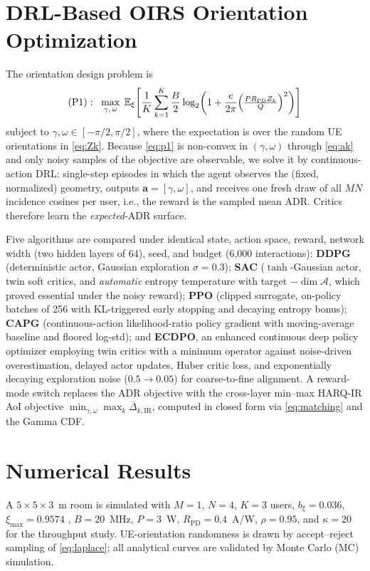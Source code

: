 \documentclass[conference]{IEEEtran}
\newcommand{\E}{\mathbb{E}}
\begin{document}
\section{DRL-Based OIRS Orientation Optimization}
The orientation design problem is
\begin{equation}
(\mathrm{P1}):\;\;
\max_{\gamma,\,\omega}\;
\E_{\xi}\!\left[\frac{1}{K}\sum_{k=1}^{K}
\frac{B}{2}\log_{2}\!\left(1+\frac{e}{2\pi}
\Bigl(\tfrac{P R_{\mathrm{PD}} Z_k}{Q}\Bigr)^{2}\right)\right]
\label{eq:p1}
\end{equation}
subject to $\gamma,\omega\in[-\pi/2,\pi/2]$, where the expectation is over
the random UE orientations in \eqref{eq:Zk}. Because \eqref{eq:p1} is
non-convex in $(\gamma,\omega)$ through \eqref{eq:ak} and only noisy samples
of the objective are observable, we solve it by continuous-action DRL:
single-step episodes in which the agent observes the (fixed, normalized)
geometry, outputs $\mathbf a=[\gamma,\omega]$, and receives one fresh draw of
all $MN$ incidence cosines per user, i.e., the reward is the sampled mean ADR.
Critics therefore learn the \emph{expected}-ADR surface.

Five algorithms are compared under identical state, action space, reward,
network width (two hidden layers of 64), seed, and budget (6{,}000
interactions): \textbf{DDPG} \cite{lillicrap2016} (deterministic actor,
Gaussian exploration $\sigma{=}0.3$); \textbf{SAC} \cite{haarnoja2018}
($\tanh$-Gaussian actor, twin soft critics, and \emph{automatic} entropy
temperature with target $-\dim\mathcal{A}$, which proved essential under the
noisy reward); \textbf{PPO} \cite{schulman2017} (clipped surrogate, on-policy
batches of 256 with KL-triggered early stopping and decaying entropy bonus);
\textbf{CAPG} (continuous-action likelihood-ratio policy gradient with
moving-average baseline and floored log-std); and \textbf{ECDPO}, an enhanced
continuous deep policy optimizer employing twin critics with a minimum
operator against noise-driven overestimation, delayed actor updates, Huber
critic loss, and exponentially decaying exploration noise
($0.5\!\to\!0.05$) for coarse-to-fine alignment. A reward-mode switch
replaces the ADR objective with the cross-layer min--max HARQ-IR AoI
objective $\min_{\gamma,\omega}\max_k \overline{\Delta}_{k,\mathrm{IR}}$,
computed in closed form via \eqref{eq:matching} and the Gamma CDF.

\section{Numerical Results}
A $5{\times}5{\times}3$~m room is simulated with $M{=}1$, $N{=}4$, $K{=}3$
users, $b_\xi{=}0.036$, $\xi_{\max}{=}0.9574$ \cite{soltani2018},
$B{=}20$~MHz, $P{=}3$~W, $R_{\mathrm{PD}}{=}0.4$~A/W, $\rho=0.95$, and
$\kappa{=}20$ for the throughput study. UE-orientation randomness is drawn by
accept--reject sampling of \eqref{eq:laplace}; all analytical curves are
validated by Monte Carlo (MC) simulation.
\end{document}
